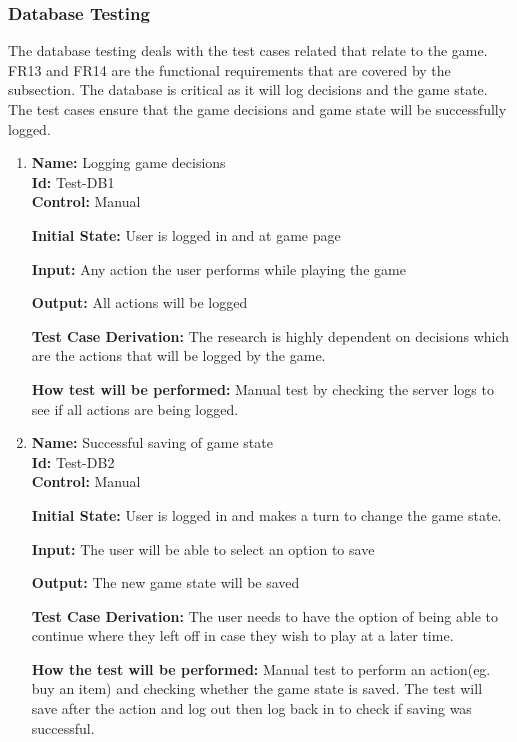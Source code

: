 \documentclass[12pt, titlepage]{article}
\begin{document}
\subsubsection{Database Testing}
The database testing deals with the test cases related that relate to the game. FR13 and FR14 are the functional requirements that are covered by the subsection. The database is critical as it will log decisions and the game state. The test cases ensure that the game decisions and game state will be successfully logged.
\begin{enumerate}

\item{\textbf{Name:} Logging game decisions\\} %
\textbf{Id:} Test-DB1    \label{Test-DB1}\\
\textbf{Control:} Manual
					
\textbf{Initial State:} User is logged in and at game page
					
\textbf{Input:} Any action the user performs while playing the game
					
\textbf{Output: }All actions will be logged

\textbf{Test Case Derivation:} The research is highly dependent on decisions which are the actions that will be logged by the game.

\textbf{How test will be performed:} Manual test by checking the server logs to see if all actions are being logged.

\item{\textbf{Name:} Successful saving of game state\\} %
\textbf{Id:} Test-DB2    \label{Test-DB2}\\
\textbf{Control:} Manual

\textbf{Initial State:} User is logged in and makes a turn to change the game state.

\textbf{Input:} The user will be able to select an option to save

\textbf{Output:} The new game state will be saved

\textbf{Test Case Derivation:} The user needs to have the option of being able to continue where they left off in case they wish to play at a later time.

\textbf{How the test will be performed:} Manual test to perform an action(eg. buy an item) and checking whether the game state is saved. The test will save after the action and log out then log back in to check if saving was successful. 


\end{enumerate}
\end{document}
